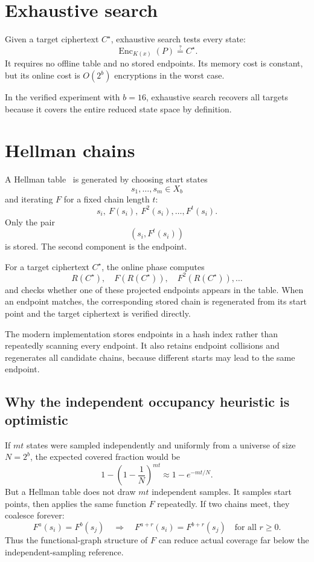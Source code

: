 \documentclass[11pt]{article}
\newcommand{\Enc}{\operatorname{Enc}}
\begin{document}
\section{Exhaustive search}

Given a target ciphertext $C^\star$, exhaustive search tests every state:
\[
  \Enc_{K(x)}(P)\stackrel{?}{=}C^\star.
\]
It requires no offline table and no stored endpoints.  Its memory cost is
constant, but its online cost is $O(2^b)$ encryptions in the worst case.

In the verified experiment with $b=16$, exhaustive search recovers all
targets because it covers the entire reduced state space by definition.

\section{Hellman chains}

A Hellman table~\cite{hellman1980} is generated by choosing start states
\[
  s_1,\ldots,s_m\in X_b
\]
and iterating $F$ for a fixed chain length $t$:
\[
  s_i,\ F(s_i),\ F^2(s_i),\ldots,F^t(s_i).
\]
Only the pair
\[
  (s_i,F^t(s_i))
\]
is stored.  The second component is the endpoint.

For a target ciphertext $C^\star$, the online phase computes
\[
  R(C^\star),\quad F(R(C^\star)),\quad F^2(R(C^\star)),\ldots
\]
and checks whether one of these projected endpoints appears in the table.
When an endpoint matches, the corresponding stored chain is regenerated from
its start point and the target ciphertext is verified directly.

The modern implementation stores endpoints in a hash index rather than
repeatedly scanning every endpoint.  It also retains endpoint collisions and
regenerates all candidate chains, because different starts may lead to the
same endpoint.

\subsection{Why the independent occupancy heuristic is optimistic}

If $mt$ states were sampled independently and uniformly from a universe of
size $N=2^b$, the expected covered fraction would be
\[
  1-\left(1-\frac{1}{N}\right)^{mt}
  \approx 1-e^{-mt/N}.
  \label{eq:occupancy}
\]
But a Hellman table does not draw $mt$ independent samples.  It samples start
points, then applies the same function $F$ repeatedly.  If two chains meet,
they coalesce forever:
\[
  F^a(s_i)=F^b(s_j)
  \quad\Longrightarrow\quad
  F^{a+r}(s_i)=F^{b+r}(s_j)
  \quad\text{for all } r\ge 0.
\]
Thus the functional-graph structure of $F$ can reduce actual coverage far
below the independent-sampling reference.
\end{document}
